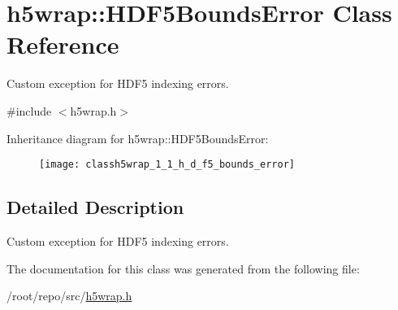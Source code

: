 \hypertarget{classh5wrap_1_1_h_d_f5_bounds_error}{}\section{h5wrap\+:\+:H\+D\+F5\+Bounds\+Error Class Reference}
\label{classh5wrap_1_1_h_d_f5_bounds_error}


Custom exception for H\+D\+F5 indexing errors.  




{\ttfamily \#include $<$h5wrap.\+h$>$}

Inheritance diagram for h5wrap\+:\+:H\+D\+F5\+Bounds\+Error\+:\begin{figure}[H]
\begin{center}
\leavevmode
\texttt{[image: classh5wrap\_1\_1\_h\_d\_f5\_bounds\_error]}
\end{center}
\end{figure}


\subsection{Detailed Description}
Custom exception for H\+D\+F5 indexing errors. 

The documentation for this class was generated from the following file\+:\begin{DoxyCompactItemize}
\item 
/root/repo/src/\hyperlink{h5wrap_8h}{h5wrap.\+h}\end{DoxyCompactItemize}
